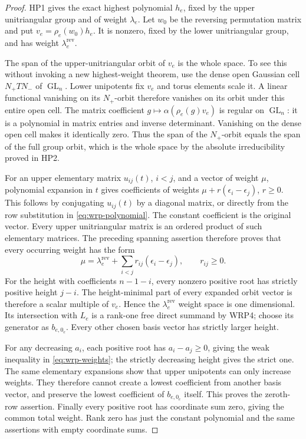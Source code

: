 \begin{proof}
HP1 gives the exact highest polynomial $h_e$, fixed by the
upper unitriangular group and of weight $\lambda_e$.
Let $w_0$ be the reversing permutation matrix and put
$v_e=\rho_e(w_0)h_e$.  It is nonzero, fixed by the lower
unitriangular group, and has weight
$\lambda_e^{\mathrm{rev}}$.

The span of the upper-unitriangular orbit of $v_e$ is the
whole space.  To see this without invoking a new
highest-weight theorem, use the dense open Gaussian cell
$N_+TN_-$ of $\operatorname{GL}_n$.  Lower unipotents fix
$v_e$ and torus elements scale it.  A linear functional
vanishing on its $N_+$-orbit therefore vanishes on its orbit
under this entire open cell.  The matrix coefficient
$g\mapsto\alpha(\rho_e(g)v_e)$ is regular on
$\operatorname{GL}_n$: it is a polynomial in matrix entries
and inverse determinant.  Vanishing on the dense open cell
makes it identically zero.  Thus the span of the $N_+$-orbit
equals the span of the full group orbit, which is the whole
space by the absolute irreducibility proved in HP2.

For an upper elementary matrix $u_{ij}(t)$, $i<j$, and a
vector of weight $\mu$, polynomial expansion in $t$ gives
coefficients of weights
$\mu+r(\epsilon_i-\epsilon_j)$, $r\geq0$.  This follows
by conjugating $u_{ij}(t)$ by a diagonal matrix, or directly
from the row substitution in \eqref{eq:wrp-polynomial}.
The constant coefficient is the original vector.  Every
upper unitriangular matrix is an ordered product of such
elementary matrices.  The preceding spanning assertion
therefore proves that every occurring weight has the form
\[
       \mu=\lambda_e^{\mathrm{rev}}
                 +\sum_{i<j}r_{ij}(\epsilon_i-\epsilon_j),
                         \qquad r_{ij}\geq0.
\]
For the height with coefficients $n-1-i$, every nonzero
positive root has strictly positive height $j-i$.  The
height-minimal part of every expanded orbit vector is
therefore a scalar multiple of $v_e$.  Hence the
$\lambda_e^{\mathrm{rev}}$ weight space is one dimensional.
Its intersection with $L_e$ is a rank-one free direct
summand by WRP4; choose its generator as $b_{e,0_e}$.
Every other chosen basis vector has strictly larger height.

For any decreasing $a_i$, each positive root has
$a_i-a_j\geq0$, giving the weak inequality in
\eqref{eq:wrp-weights}; the strictly decreasing height gives
the strict one.  The same elementary expansions show that
upper unipotents can only increase weights.  They therefore
cannot create a lowest coefficient from another basis
vector, and preserve the lowest coefficient of
$b_{e,0_e}$ itself.  This proves the zeroth-row assertion.
Finally every positive root has coordinate sum zero,
giving the common total weight.  Rank zero has just the
constant polynomial and the same assertions with empty
coordinate sums.
\end{proof}

